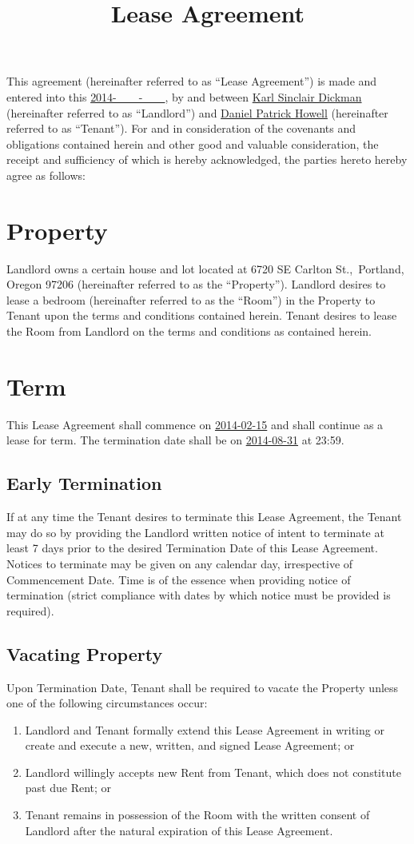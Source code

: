 \documentclass{amsart}
\title{Lease Agreement}
\begin{document}
\maketitle
This agreement (hereinafter referred to as ``Lease Agreement'') is made and
entered into this \underline{2014-\ \ \ \ -\ \ \ \ }, by and between \underline{Karl
Sinclair Dickman} (hereinafter referred to as ``Landlord'') and
\underline{Daniel Patrick Howell} (hereinafter referred to as ``Tenant'').  For
and in consideration of the covenants and obligations contained herein and other
good and valuable consideration, the receipt and sufficiency of which is hereby
acknowledged, the parties hereto hereby agree as follows:
\section{Property}
Landlord owns a certain house and lot located at 6720 SE Carlton St.,\ Portland,
Oregon 97206 (hereinafter referred to as the ``Property''). Landlord desires to
lease a bedroom (hereinafter referred to as the ``Room'') in the Property to
Tenant upon the terms and conditions contained herein. Tenant desires to lease
the Room from Landlord on the terms and conditions as contained herein.
\section{Term}
\label{sec:Term}
This Lease Agreement shall commence on \underline{2014-02-15} and shall continue
as a lease for term. The termination date shall be on \underline{2014-08-31} at
23:59.
\subsection{Early Termination}
\label{sec:early-termination}
If at any time the Tenant desires to terminate this Lease Agreement, the Tenant
may do so by providing the Landlord written notice of intent to terminate at
least 7 days prior to the desired Termination Date of this Lease Agreement.
Notices to terminate may be given on any calendar day, irrespective of
Commencement Date. Time is of the essence when providing notice of termination
(strict compliance with dates by which notice must be provided is required).
\subsection{Vacating Property}
Upon Termination Date, Tenant shall be required to vacate the Property unless
one of the following circumstances occur:
\begin{enumerate}
    \item Landlord and Tenant formally extend this Lease Agreement in writing or
        create and execute a new, written, and signed  Lease Agreement; or
    \item Landlord willingly accepts new Rent from Tenant, which does not
        constitute past due Rent; or
    \item Tenant remains in possession of the Room with the written consent of
        Landlord after the natural expiration of this Lease Agreement.
\end{enumerate}
\end{document}
